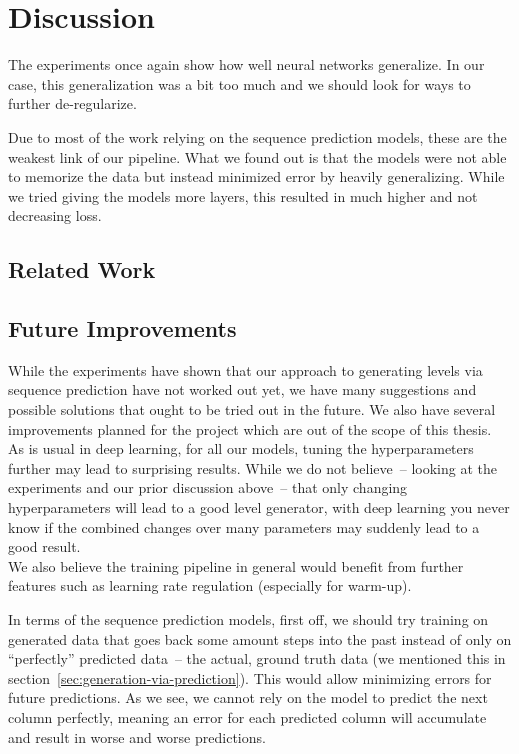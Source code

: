 \section{Discussion}

The experiments once again show how well neural networks generalize.
In our case, this generalization was a bit too much and we should look
for ways to further de-regularize.

Due to most of the work relying on the sequence prediction models,
these are the weakest link of our pipeline. What we found out is that
the models were not able to memorize the data but instead minimized
error by heavily generalizing. While we tried giving the models more
layers, this resulted in much higher and not decreasing loss.

\subsection{Related Work}



\subsection{Future Improvements}

While the experiments have shown that our approach to generating
levels via sequence prediction have not worked out yet, we have many
suggestions and possible solutions that ought to be tried out in the
future. We also have several improvements planned for the project
which are out of the scope of this thesis. \\
As is usual in deep learning, for all our models, tuning the
hyperparameters further may lead to surprising results. While we do
not believe~-- looking at the experiments and our prior discussion
above~-- that only changing hyperparameters will lead to a good level
generator, with deep learning you never know if the combined changes
over many parameters may suddenly lead to a good result. \\
We also believe the training pipeline in general would benefit from
further features such as learning rate regulation (especially for
warm-up).

In terms of the sequence prediction models, first off, we should try
training on generated data that goes back some amount steps into the
past instead of only on ``perfectly'' predicted data~-- the actual,
ground truth data (we mentioned this in
section~\ref{sec:generation-via-prediction}). This would allow
minimizing errors for future predictions. As we see, we cannot rely on
the model to predict the next column perfectly, meaning an error for
each predicted column will accumulate and result in worse and worse
predictions.


